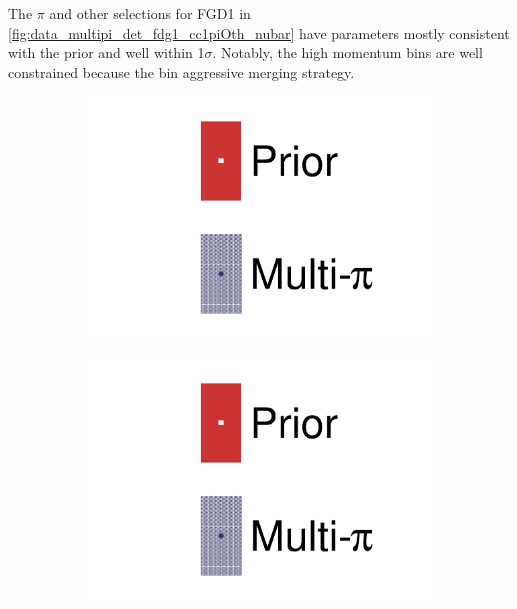 The $\pi$ and other selections for FGD1 in \autoref{fig:data_multipi_det_fdg1_cc1piOth_nubar} have parameters mostly consistent with the prior and well within 1$\sigma$. Notably, the high momentum bins are well constrained because the bin aggressive merging strategy. 
\begin{figure}[h]
	\centering
	\begin{subfigure}[t]{0.1\textwidth}
		\includegraphics[width=\textwidth,page=1, trim={0mm 120mm 40mm 20mm}, clip]{figures/mach3/2018/data/2018a_FixedCov_RedCov_Mpi_Data_merge_drawPar_withDet}
	\end{subfigure}
	\begin{subfigure}[t]{0.1\textwidth}
		\includegraphics[width=\textwidth,page=1, trim={0mm 20mm 40mm 120mm}, clip]{figures/mach3/2018/data/2018a_FixedCov_RedCov_Mpi_Data_merge_drawPar_withDet}
	\end{subfigure}


\end{figure}
